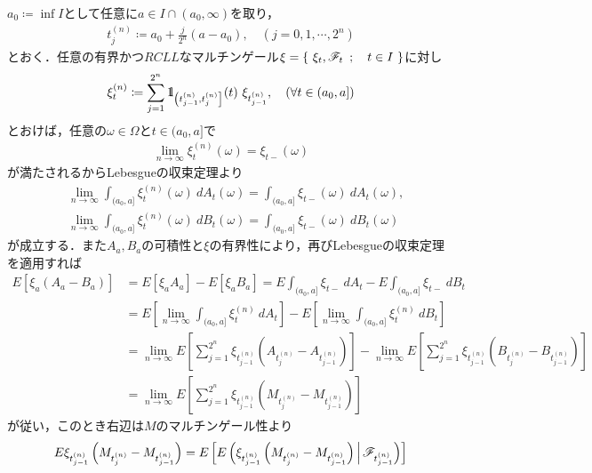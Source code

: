 	\begin{prf}
		$a_0 \coloneqq \inf{}{I}$として任意に$a \in I \cap (a_0,\infty)$を取り，
		\begin{align}
			t^{(n)}_j \coloneqq a_0 + \frac{j}{2^n}(a-a_0), \quad (j=0,1,\cdots,2^n)
		\end{align}
		とおく．任意の有界かつ$RCLL$なマルチンゲール$\xi = \left\{\ \xi_t,\mathscr{F}_t\ \, ; \quad t \in I\ \right\}$に対し
		\begin{align}
			\xi^{(n)}_t \coloneqq \sum_{j=1}^{2^n} \mbox{1}\hspace{-0.25em}\mbox{l}_{\left(t_{j-1}^{(n)},t_j^{(n)}\right]}(t)\ \xi_{t^{(n)}_{j-1}},
			\quad (\forall t \in (a_0,a])
		\end{align}
		とおけば，任意の$\omega \in \Omega$と$t \in (a_0,a]$で
		\begin{align}
			\lim_{n \to \infty} \xi^{(n)}_t(\omega) = \xi_{t-}(\omega)
		\end{align}
		が満たされるからLebesgueの収束定理より
		\begin{align}
			&\lim_{n \to \infty} \int_{(a_0,a]} \xi^{(n)}_t(\omega)\ dA_t(\omega) 
				= \int_{(a_0,a]} \xi_{t-}(\omega)\ dA_t(\omega), \\
			&\lim_{n \to \infty} \int_{(a_0,a]} \xi^{(n)}_t(\omega)\ dB_t(\omega) 
				= \int_{(a_0,a]} \xi_{t-}(\omega)\ dB_t(\omega)
		\end{align}
		が成立する．また$A_a,B_a$の可積性と$\xi$の有界性により，再びLebesgueの収束定理を適用すれば
		\begin{align}
			E\left[ \xi_a\left( A_a - B_a \right) \right]
			&= E\left[ \xi_a A_a \right] -  E\left[ \xi_a B_a \right]
			= E \int_{(a_0,a]} \xi_{t-}\ dA_t - E\int_{(a_0,a]} \xi_{t-}\ dB_t \\
			&= E \left[ \lim_{n \to \infty} \int_{(a_0,a]} \xi^{(n)}_t\ dA_t \right]
				- E \left[ \lim_{n \to \infty} \int_{(a_0,a]} \xi^{(n)}_t\ dB_t \right] \\
			&= \lim_{n \to \infty} E\left[ \sum_{j=1}^{2^n}\xi_{t^{(n)}_{j-1}}\left( A_{t^{(n)}_j} - A_{t^{(n)}_{j-1}} \right) \right]
				-  \lim_{n \to \infty} E \left[ \sum_{j=1}^{2^n}\xi_{t^{(n)}_{j-1}}\left( B_{t^{(n)}_j} - B_{t^{(n)}_{j-1}} \right) \right] \\
			&= \lim_{n \to \infty} E \left[ \sum_{j=1}^{2^n}\xi_{t^{(n)}_{j-1}}\left( M_{t^{(n)}_j} - M_{t^{(n)}_{j-1}} \right) \right]
		\end{align}
		が従い，このとき右辺は$M$のマルチンゲール性より
		\begin{align}
			E\xi_{t^{(n)}_{j-1}}\left( M_{t^{(n)}_j} - M_{t^{(n)}_{j-1}} \right)
			= E \left[\cexp{\xi_{t^{(n)}_{j-1}}\left( M_{t^{(n)}_j} - M_{t^{(n)}_{j-1}} \right)}{\mathscr{F}_{t^{(n)}_{j-1}}} \right]

\end{align}
\end{prf}
